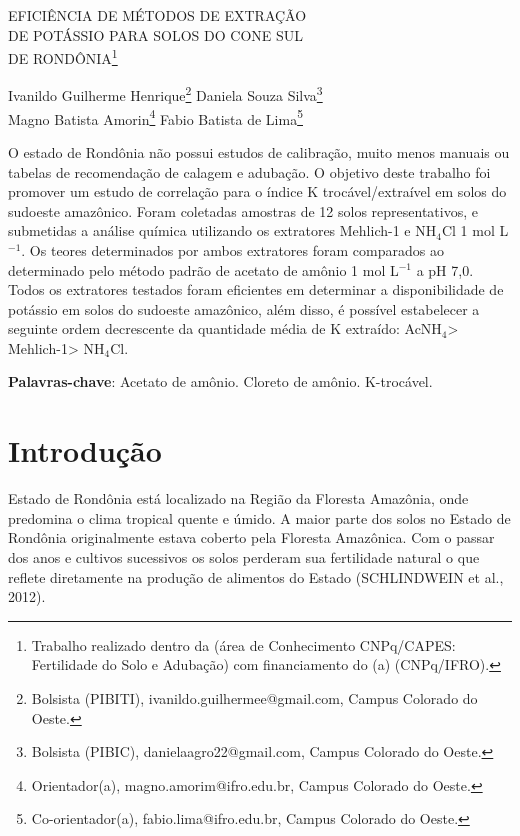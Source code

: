 \documentclass[article,12pt,onesidea,4paper,english,brazil]{abntex2}
\begin{document}
	
	
	\frenchspacing 
	
	\begin{center}
		\LARGE EFICIÊNCIA DE MÉTODOS DE EXTRAÇÃO\\DE POTÁSSIO PARA SOLOS DO CONE SUL\\DE RONDÔNIA\footnote{Trabalho realizado dentro da (área de Conhecimento CNPq/CAPES: Fertilidade do Solo e Adubação) com financiamento do (a) (CNPq/IFRO).}
		
		\normalsize
		Ivanildo Guilherme Henrique\footnote{Bolsista (PIBITI), ivanildo.guilhermee@gmail.com, Campus Colorado do Oeste.} 
		Daniela Souza Silva\footnote{Bolsista (PIBIC), danielaagro22@gmail.com, Campus Colorado do Oeste.} \\
		Magno Batista Amorin\footnote{Orientador(a), magno.amorim@ifro.edu.br, Campus Colorado do Oeste.} 
		Fabio Batista de Lima\footnote{Co-orientador(a), fabio.lima@ifro.edu.br, Campus Colorado do Oeste.} 
	\end{center}
	
	\begin{resumoumacoluna}
		O estado de Rondônia não possui estudos de calibração, muito menos manuais ou tabelas de recomendação de calagem e adubação. O objetivo deste trabalho foi promover um estudo de correlação para o índice K trocável/extraível em solos do sudoeste amazônico. Foram coletadas amostras de 12 solos representativos, e submetidas a análise química utilizando os extratores Mehlich-1 e NH$_4$Cl 1 mol L$^{-1}$. Os teores determinados por ambos extratores foram comparados ao determinado pelo método padrão de acetato de amônio 1 mol L$^{-1}$ a pH 7,0. Todos os extratores testados foram eficientes em determinar a disponibilidade de potássio em solos do sudoeste amazônico, além disso, é possível estabelecer a seguinte ordem decrescente da quantidade média de K extraído: AcNH$_4$> Mehlich-1> NH$_4$Cl.
		
		\vspace{\onelineskip}
		
		\noindent
		\textbf{Palavras-chave}: Acetato de amônio. Cloreto de amônio. K-trocável. 
	\end{resumoumacoluna}
	
	\section*{Introdução}
	
	Estado de Rondônia está localizado na Região da Floresta Amazônia, onde predomina o clima tropical quente e úmido. A maior parte dos solos no Estado de Rondônia originalmente estava coberto pela Floresta Amazônica. Com o passar dos anos e cultivos sucessivos os solos perderam sua fertilidade natural o que reflete diretamente na produção de alimentos do Estado (SCHLINDWEIN et al., 2012).
	
\end{document}
